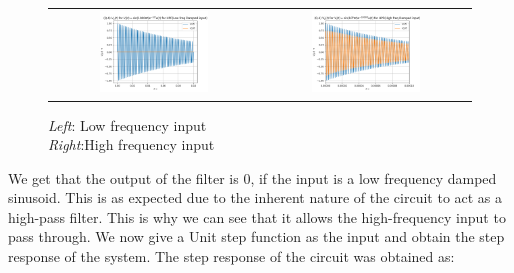 \documentclass[11pt, a4paper]{article}
\begin{document}
\begin{figure}[H]
    \centering
    \setlength\tabcolsep{1pt}
    \begin{tabular}{cc}
        \includegraphics[width=0.55\textwidth]{Figure_5.png} &
        \includegraphics[width=0.55\textwidth]{Figure_6.png}\\
    \end{tabular}
    \caption{\textit{Left}: Low frequency input\\\textit{Right}:High frequency input}
\end{figure}

We get that the output of the filter is 0, if the input is a low frequency damped sinusoid. This is as expected due to the inherent nature of the circuit to act as a high-pass filter. This is why we can see that it allows the high-frequency input to pass through.
\newline\newline\newline
We now give a Unit step function as the input and obtain the step response of the system.
The step response of the circuit was obtained as:
\end{document}
